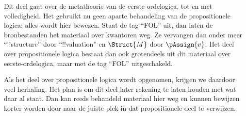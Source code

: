\documentclass[../../include/open-logic-part]{subfiles}
\begin{document}

\begin{editorial}
  Dit deel gaat over de metatheorie van de eerste-ordelogica, tot en met
  volledigheid. Het gebruikt nu geen aparte behandeling van de
  propositionele logica: alles wordt hier bewezen. Staat de tag ``FOL''
  uit, dan laten de bronbestanden het materiaal over kwantoren weg. Ze
  vervangen dan onder meer ``!!{structure}'' door ``!!{valuation}''
  en $\Struct{M}$ door $\pAssign{v}$. Het deel over propositionele
  logica bestaat dan ook grotendeels uit dit materiaal over
  eerste-ordelogica, maar met de tag ``FOL'' uitgeschakeld.

  Als het deel over propositionele logica wordt opgenomen, krijgen we
  daardoor veel herhaling. Het plan is om dit deel later rekening te
  laten houden met wat daar al staat. Dan kan reeds behandeld materiaal
  hier weg en kunnen bewijzen korter worden door naar de juiste plek in
  dat propositionele deel te verwijzen.
\end{editorial}












\OLEndPartHook
\end{document}
